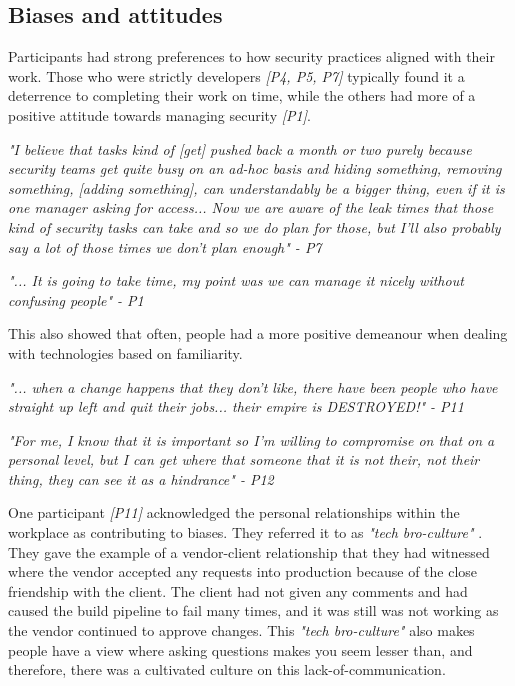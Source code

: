 \subsection{Biases and attitudes}

\par Participants had strong preferences to how security practices aligned with their work. Those who were strictly developers \textit{[P4, P5, P7]} typically found it a deterrence to completing their work on time, while the others had more of a positive attitude towards managing security \textit{[P1]}. 
\newline
\par 
\textit{"I believe that tasks kind of [get] pushed back a month or two purely because security teams get quite busy on an ad-hoc basis and hiding something, removing something, [adding something], can understandably be a bigger thing, even if it is one manager asking for access... Now we are aware of the leak times that those kind of security tasks can take and so we do plan for those, but I'll also probably say a lot of those times we don't plan enough" - P7}
\newline
\par
\textit{"... It is going to take time, my point was we can manage it nicely without confusing people" - P1}
\newline
\par
This also showed that often, people had a more positive demeanour when dealing with technologies based on familiarity. 
\newline
\par \textit{"... when a change happens that they don't like, there have been people who have straight up left and quit their jobs... their empire is DESTROYED!"  - P11}
\newline
\par
\textit{"For me, I know that it is important so I'm willing to compromise on that on a personal level, but I can get where that someone that it is not their, not their thing, they can see it as a hindrance"  - P12}
\newline
\par One participant \textit{[P11]} acknowledged the personal relationships within the workplace as contributing to biases. They referred it to as  \textit{"tech bro-culture" }. They gave the example of a vendor-client relationship that they had witnessed where the vendor accepted any requests into production because of the close friendship with the client. The client had not given any comments and had caused the build pipeline to fail many times, and it was still was not working as the vendor continued to approve changes. This \textit{"tech bro-culture"}  also makes people have a view where asking questions makes you seem lesser than, and therefore, there was a cultivated culture on this lack-of-communication. 


